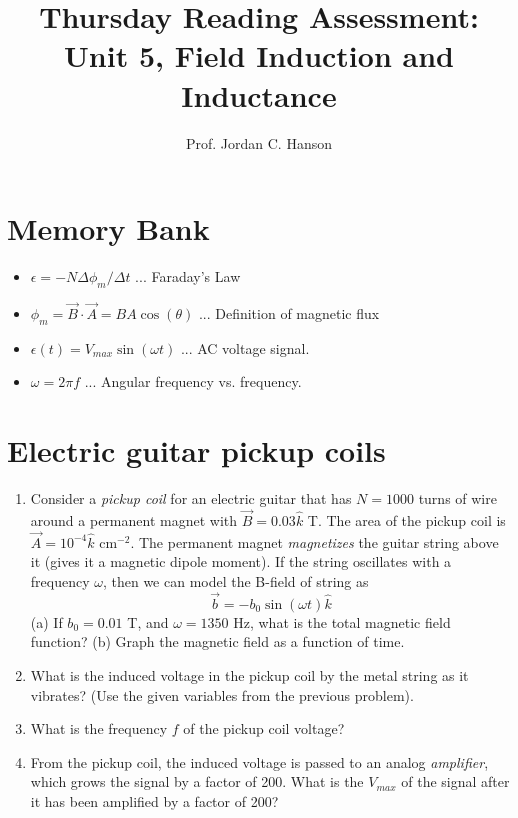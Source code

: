 \documentclass{article}
\begin{document}
\title{Thursday Reading Assessment: Unit 5, Field Induction and Inductance}
\author{Prof. Jordan C. Hanson}

\maketitle

\section{Memory Bank}

\begin{itemize}
\item $\epsilon = -N \Delta \phi_m /\Delta t$ ... Faraday's Law
\item $\phi_m = \vec{B} \cdot \vec{A} = BA \cos(\theta)$ ... Definition of magnetic flux
\item $\epsilon(t) = V_{max} \sin(\omega t)$ ... AC voltage signal.
\item $\omega = 2\pi f$ ... Angular frequency vs. frequency.
\end{itemize}

\section{Electric guitar pickup coils}

\begin{enumerate}
\item Consider a \textit{pickup coil} for an electric guitar that has $N = 1000$ turns of wire around a permanent magnet with $\vec{B} = 0.03\hat{k}$ T. The area of the pickup coil is $\vec{A} = 10^{-4}\hat{k}$ cm$^{-2}$. The permanent magnet \textit{magnetizes} the guitar string above it (gives it a magnetic dipole moment).  If the string oscillates with a frequency $\omega$, then we can model the B-field of string as
\begin{equation}
\vec{b} = -b_0\sin(\omega t)\hat{k}
\end{equation}
(a) If $b_0 = 0.01$ T, and $\omega = 1350$ Hz, what is the total magnetic field function?  (b) Graph the magnetic field as a function of time. \\ \vspace{2cm}
\item What is the induced voltage in the pickup coil by the metal string as it vibrates? (Use the given variables from the previous problem). \\ \vspace{2cm}
\item What is the frequency $f$ of the pickup coil voltage? \\ \vspace{1cm}
\item From the pickup coil, the induced voltage is passed to an analog \textit{amplifier}, which grows the signal by a factor of 200.  What is the $V_{max}$ of the signal after it has been amplified by a factor of 200?
\end{enumerate}
\end{document}
